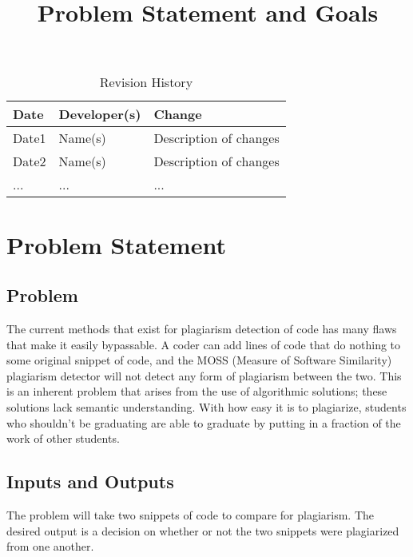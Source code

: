\documentclass{article}
\title{Problem Statement and Goals\\\progname}
\author{\authname}
\date{}
\begin{document}
\maketitle

\begin{table}[hp]
\caption{Revision History} \label{TblRevisionHistory}
\begin{tabularx}{\textwidth}{llX}
\toprule
\textbf{Date} & \textbf{Developer(s)} & \textbf{Change}\\
\midrule
Date1 & Name(s) & Description of changes\\
Date2 & Name(s) & Description of changes\\
... & ... & ...\\
\bottomrule
\end{tabularx}
\end{table}

\section{Problem Statement}



\subsection{Problem}
The current methods that exist for plagiarism detection of code has many flaws that make it easily bypassable. A coder can add lines of code that do nothing to some original snippet of code, and the MOSS (Measure of Software Similarity) plagiarism detector will not detect any form of plagiarism between the two. This is an inherent problem that arises from the use of algorithmic solutions; these solutions lack semantic understanding. With how easy it is to plagiarize, students who shouldn't be graduating are able to graduate by putting in a fraction of the work of other students. 

\subsection{Inputs and Outputs}
The problem will take two snippets of code to compare for plagiarism. The desired output is a decision on whether or not the two snippets were plagiarized from one another. 
\end{document}
